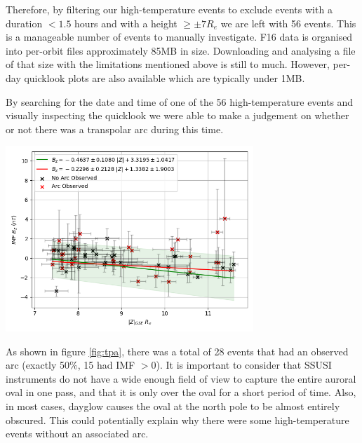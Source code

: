 \documentclass[12pt]{article}
\newenvironment{Figure}
  {\par\medskip\noindent\minipage{\linewidth}}
  {\endminipage\par\medskip}
\begin{document}
Therefore, by filtering our high-temperature events to exclude events with a duration $< 1.5$ hours and with a height $\ge\pm7R_e$ we are left with 56 events. This is a manageable number of events to manually investigate. F16 data is organised into per-orbit files approximately 85MB in size. Downloading and analysing a file of that size with the limitations mentioned above is still to much. However, per-day quicklook plots are also available which are typically under 1MB. 

By searching for the date and time of one of the 56 high-temperature events and visually inspecting the quicklook we were able to make a judgement on whether or not there was a transpolar arc during this time.

\begin{Figure}
    \centering
    \includegraphics[width=0.7\textwidth]{tpa.png}
    \label{fig:tpa}
\end{Figure}

As shown in figure \ref{fig:tpa}, there was a total of 28 events that had an observed arc (exactly 50\%, 15 had IMF $> 0$). It is important to consider that SSUSI instruments do not have a wide enough field of view to capture the entire auroral oval in one pass, and that it is only over the oval for a short period of time. Also, in most cases, dayglow causes the oval at the north pole to be almost entirely obscured. This could potentially explain why there were some high-temperature events without an associated arc.
\end{document}
